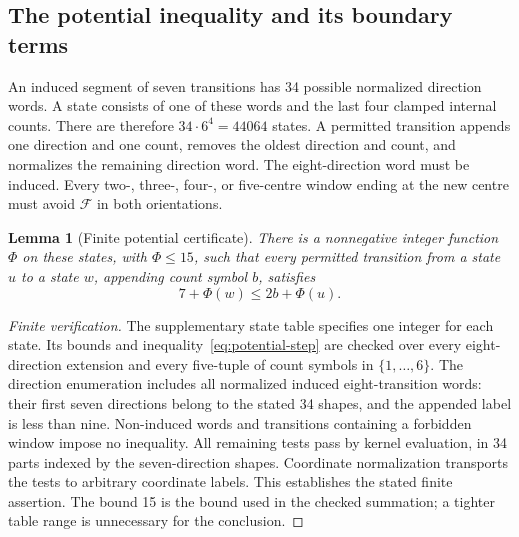 \documentclass[11pt,a4paper]{article}
\newtheorem{lemma}[theorem]{Lemma}
\theoremstyle{definition}
\theoremstyle{remark}
\begin{document}
\subsection{The potential inequality and its boundary terms}
An induced segment of seven transitions has 34 possible normalized direction words. A state consists of one of these words and the last four clamped internal counts. There are therefore $34\cdot6^4=44064$ states. A permitted transition appends one direction and one count, removes the oldest direction and count, and normalizes the remaining direction word. The eight-direction word must be induced. Every two-, three-, four-, or five-centre window ending at the new centre must avoid $\mathcal F$ in both orientations.

\begin{lemma}[Finite potential certificate]\label{lem:potential-certificate}
There is a nonnegative integer function $\Phi$ on these states, with $\Phi\le15$, such that every permitted transition from a state $u$ to a state $w$, appending count symbol $b$, satisfies
\begin{equation}\label{eq:potential-step}
7+\Phi(w)\le2b+\Phi(u).
\end{equation}
\end{lemma}
\begin{proof}[Finite verification]
The supplementary state table specifies one integer for each state. Its bounds and inequality~\eqref{eq:potential-step} are checked over every eight-direction extension and every five-tuple of count symbols in $\{1,\ldots,6\}$. The direction enumeration includes all normalized induced eight-transition words: their first seven directions belong to the stated 34 shapes, and the appended label is less than nine. Non-induced words and transitions containing a forbidden window impose no inequality. All remaining tests pass by kernel evaluation, in 34 parts indexed by the seven-direction shapes. Coordinate normalization transports the tests to arbitrary coordinate labels. This establishes the stated finite assertion. The bound 15 is the bound used in the checked summation; a tighter table range is unnecessary for the conclusion.
\end{proof}
\end{document}
